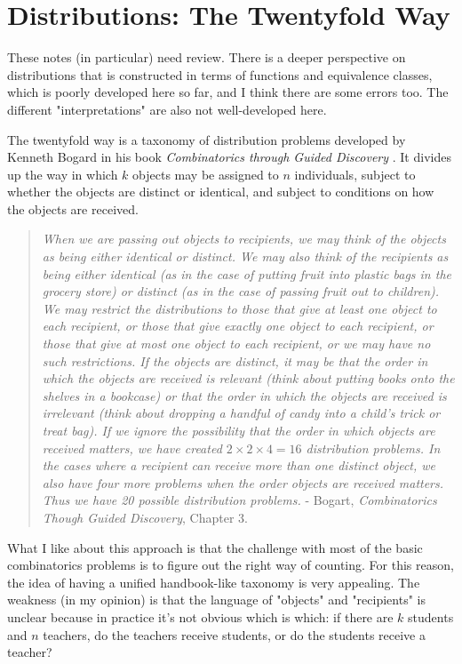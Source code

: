 \section{Distributions: The Twentyfold Way}
\label{twentyfoldway}

These notes (in particular) need review. There is a deeper perspective on distributions that is constructed in terms of functions and equivalence classes, which is poorly developed here so far, and I think there are some errors too. The different "interpretations" are also not well-developed here.

The twentyfold way is a taxonomy of distribution problems developed by Kenneth Bogard in his book \textit{Combinatorics through Guided Discovery} \cite{bogart2004combinatorics}. It divides up the way in which $k$ objects may be assigned to $n$ individuals, subject to whether the objects are distinct or identical, and subject to conditions on how the objects are received.


\begin{quote}
\textit{When we are passing out objects to recipients, we may think of the objects as being either identical or distinct. We may also think of the recipients as being either identical (as in the case of putting fruit into plastic bags in the grocery store) or distinct (as in the case of passing fruit out to children). We may restrict the distributions to those that give at least one object to each recipient, or those that give exactly one object to each recipient, or those that give at most one object to each recipient, or we may have no such restrictions. If the objects are distinct, it may be that the order in which the objects are received is relevant (think about putting books onto the shelves in a bookcase) or that the order in which the objects are received is irrelevant (think about dropping a handful of candy into a child’s trick or treat bag). If we ignore the possibility that the order in which objects are received matters, we have created $2\times2\times4 = 16$ distribution problems. In the cases where a recipient can receive more than one distinct object, we also have four more problems when the order objects are received matters. Thus we have 20 possible distribution problems.} - Bogart, \textit{Combinatorics Though Guided Discovery}, Chapter 3.
\end{quote}


What I like about this approach is that the challenge with most of the basic combinatorics problems is to figure out the right way of counting. For this reason, the idea of having a unified handbook-like taxonomy is very appealing. The weakness (in my opinion) is that the language of "objects" and "recipients" is unclear because in practice it's not obvious which is which: if there are $k$ students and $n$ teachers, do the teachers receive students, or do the students receive a teacher? 

